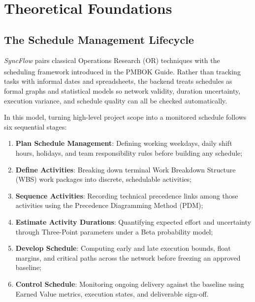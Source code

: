 \chapter{Theoretical Foundations}
\section{The Schedule Management Lifecycle}
\textit{SyncFlow} pairs classical Operations Research (OR) techniques with the scheduling framework introduced in the PMBOK\textsuperscript{\textregistered} Guide. Rather than tracking tasks with informal dates and spreadsheets, the backend treats schedules as formal graphs and statistical models so network validity, duration uncertainty, execution variance, and schedule quality can all be checked automatically.

\vspace{4mm}

In this model, turning high-level project scope into a monitored schedule follows six sequential stages:
\begin{enumerate}[leftmargin=*,itemsep=1pt,topsep=1pt]
    \item \textbf{Plan Schedule Management}: Defining working weekdays, daily shift hours, holidays, and team responsibility rules before building any schedule;
    
    \vspace{1mm}
    
    \item \textbf{Define Activities}: Breaking down terminal Work Breakdown Structure (WBS) work packages into discrete, schedulable activities;
    
    \vspace{1mm}
    
    \item \textbf{Sequence Activities}: Recording technical precedence links among those activities using the Precedence Diagramming Method (PDM);
    
    \vspace{1mm}
    
    \item \textbf{Estimate Activity Durations}: Quantifying expected effort and uncertainty through Three-Point parameters under a Beta probability model;
    
    \vspace{1mm}
    
    \item \textbf{Develop Schedule}: Computing early and late execution bounds, float margins, and critical paths across the network before freezing an approved baseline;
    
    \vspace{1mm}
    
    \item \textbf{Control Schedule}: Monitoring ongoing delivery against the baseline using Earned Value metrics, execution states, and deliverable sign-off.
\end{enumerate}

